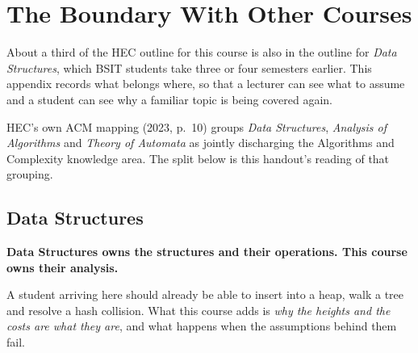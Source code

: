 \chapter{The Boundary With Other Courses}\label{app:boundary}
\normalfigures

About a third of the HEC outline for this course is also in the outline for
\emph{Data Structures}, which BSIT students take three or four semesters
earlier. This appendix records what belongs where, so that a lecturer can see
what to assume and a student can see why a familiar topic is being covered
again.

HEC's own ACM mapping (2023, p.~10) groups \emph{Data Structures},
\emph{Analysis of Algorithms} and \emph{Theory of Automata} as jointly
discharging the Algorithms and Complexity knowledge area. The split below is
this handout's reading of that grouping.

\section{Data Structures}

\begin{conceptbox}
\textbf{Data Structures owns the structures and their operations. This course
owns their analysis.}

\smallskip
A student arriving here should already be able to insert into a heap, walk a
tree and resolve a hash collision. What this course adds is \emph{why the
heights and the costs are what they are}, and what happens when the assumptions
behind them fail.
\end{conceptbox}

